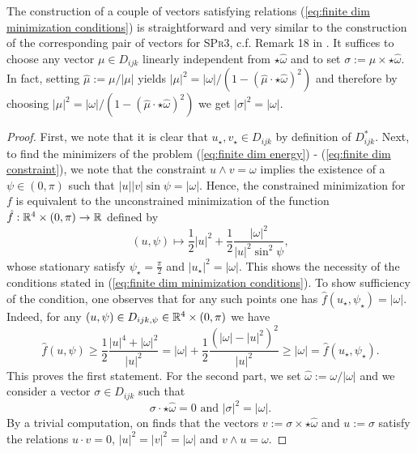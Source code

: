 \begin{remark}
The construction of a couple of vectors satisfying relations (\ref{eq:finite dim minimization conditions}) is straightforward and very similar to the construction of the corresponding pair of vectors for \textsc{SPr3}, c.f. Remark 18 in \cite{Alouges2017}. It suffices to choose any vector $\mu \in D_{ijk}$ linearly independent from $\star \hat{\omega}$ and to set $\sigma := \mu \times \star\hat{\omega}$. In fact, setting $\hat{\mu} := \mu / |\mu|$ yields $|\mu|^2 = |\omega|/(1 - (\hat{\mu} \cdot \star\hat{\omega})^2)$ and therefore by choosing $|\mu|^2 = |\omega|/(1 - (\hat{\mu} \cdot \star \hat{\omega})^2)$ we get $|\sigma|^2 = |\omega|$.
\end{remark}

\begin{proof}
First, we note that it is clear that $u_{\star}, v_{\star} \in D_{ijk}$ by definition of $D_{ijk}^{*}$.
Next, to find the minimizers of the problem (\ref{eq:finite dim energy}) - (\ref{eq:finite dim constraint}), we note that the constraint $u \wedge v = \omega$ implies the existence of a $\psi \in (0, \pi)$ such that $|u||v| \sin \psi= |\omega|$. Hence, the constrained minimization for $f$ is equivalent to the unconstrained minimization of the function $\hat{f}: \mathbb{R}^4 \times (0, \pi) \to \mathbb{R}$ defined by
\begin{equation}
(u, \psi) \mapsto \frac{1}{2} |u|^2 + \frac{1}{2} \frac{|\omega|^2}{|u|^2 \sin^2\psi},
\end{equation}
whose stationary satisfy $\psi_{\star} = \frac{\pi}{2}$ and $|u_{\star}|^2 = |\omega|$. This shows the necessity of the conditions stated in (\ref{eq:finite dim minimization conditions}). To show sufficiency of the condition, one observes that for any such points one has $\hat{f}(u_{\star}, \psi_{\star}) = |\omega|$. Indeed, for any $(u, \psi) \in D_{ijk, \psi} \in \mathbb{R}^4 \times (0, \pi)$ we have
\begin{equation}
\hat{f}(u, \psi) \geq \frac{1}{2} \frac{|u|^4 + |\omega|^2}{|u|^2} = |\omega| + \frac{1}{2}\frac{(|\omega| - |u|^2)^2}{|u|^2} \geq |\omega| = \hat{f}(u_{\star}, \psi_{\star}).
\end{equation}
This proves the first statement. For the second part, we set $\hat{\omega} := \omega/|\omega|$ and we consider a vector $\sigma \in D_{ijk}$ such that
\begin{equation}
	\sigma \cdot \star\hat{\omega} = 0 \text{ and } |\sigma|^2 = |\omega|. 
\end{equation}
By a trivial computation, on finds that the vectors $v := \sigma \times \star \hat{\omega}$ and $u := \sigma$ satisfy the relations $u \cdot v = 0$, $|u|^2 = |v|^2 = |\omega|$ and $v \wedge u = \omega$. 
\end{proof}

